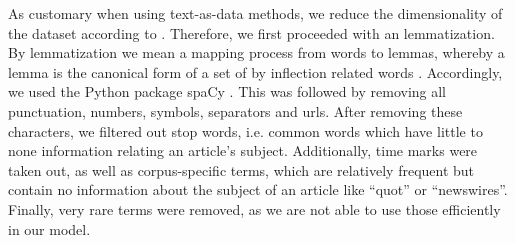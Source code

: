 As customary when using text-as-data methods, we reduce the dimensionality of the dataset according to \cite{grimmer.2022}. Therefore, we first proceeded with an lemmatization. By lemmatization we mean a mapping process from words to lemmas, whereby a lemma is the canonical form of a set of by inflection related words \citep{grimmer.2022}. Accordingly, we used the Python package spaCy \citep{spacy.2017}. This was followed by removing all punctuation, numbers, symbols, separators and urls. After removing these characters, we filtered out stop words, i.e. common words which have little to none information relating an article's subject. Additionally, time marks were taken out, as well as corpus-specific terms, which are relatively frequent but contain no information about the subject of an article like ``quot'' or ``newswires''. Finally, very rare terms were removed, as we are not able to use those efficiently in our model. 


